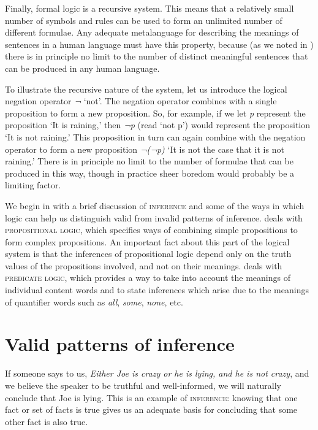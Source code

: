 Finally, formal logic is a recursive system. This means that a relatively small number of symbols and rules can be used to form an unlimited number of different formulae. Any adequate metalanguage for describing the meanings of sentences in a human language must have this property, because (as we noted in ) there is in principle no limit to the number of distinct meaningful sentences that can be produced in any human language.



To illustrate the recursive nature of the system, let us introduce the logical negation operator \textit{¬} ‘not’. The negation operator combines with a single proposition to form a new proposition. So, for example, if we let \textit{p} represent the proposition ‘It is raining,’ then \textit{¬p} (read ‘not p’) would represent the proposition ‘It is not raining.’ This proposition in turn can again combine with the negation operator to form a new proposition \textit{¬(¬p)} ‘It is not the case that it is not raining.’ There is in principle no limit to the number of formulae that can be produced in this way, though in practice sheer boredom would probably be a limiting factor.



We begin in  with a brief discussion of \textsc{inference} and some of the ways in which logic can help us distinguish valid from invalid patterns of inference.  deals with \textsc{propositional logic}, which specifies ways of combining simple propositions to form complex propositions. An important fact about this part of the logical system is that the inferences of propositional logic depend only on the truth values of the propositions involved, and not on their meanings.  deals with \textsc{predicate logic}, which provides a way to take into account the meanings of individual content words and to state inferences which arise due to the meanings of quantifier words such as \textit{all}, \textit{some}, \textit{none}, etc.


\section{Valid patterns of inference}\label{sec:4.2}

If someone says to us, \textit{Either Joe is crazy or he is lying, and he is not crazy}, and we believe the speaker to be truthful and well-informed, we will naturally conclude that Joe is lying. This is an example of \textsc{inference}: knowing that one fact or set of facts is true gives us an adequate basis for concluding that some other fact is also true.



